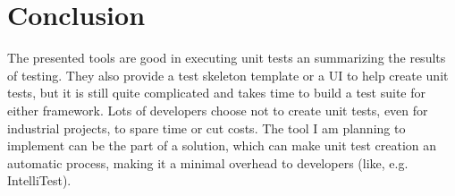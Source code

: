 \section{Conclusion}
The presented tools are good in executing unit tests an summarizing the results of testing. They also provide a test skeleton template or a UI to help create unit tests, but it is still quite complicated and takes time to build a test suite for either framework. Lots of developers choose not to create unit tests, even for industrial projects, to spare time or cut costs. The tool I am planning to implement can be the part of a solution, which can make unit test creation an automatic process, making it a minimal overhead to developers (like, e.g. IntelliTest).   
